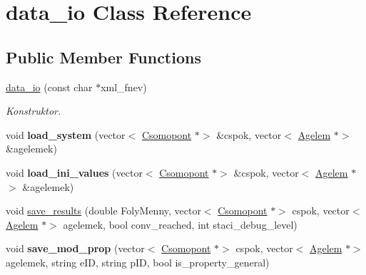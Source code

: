 \hypertarget{classdata__io}{}\section{data\+\_\+io Class Reference}
\label{classdata__io}
\subsection*{Public Member Functions}
\begin{DoxyCompactItemize}
\item 
\mbox{\label{classdata__io_ab2af4a1c42da224e002c9221f7117129}} 
\hyperlink{classdata__io_ab2af4a1c42da224e002c9221f7117129}{data\+\_\+io} (const char $\ast$xml\+\_\+fnev)
\begin{DoxyCompactList}\small\item\em Konstruktor. \end{DoxyCompactList}\item 
\mbox{\label{classdata__io_a6b94381a36f297a3c3014fd593035581}} 
void {\bfseries load\+\_\+system} (vector$<$ \hyperlink{class_csomopont}{Csomopont} $\ast$$>$ \&cspok, vector$<$ \hyperlink{class_agelem}{Agelem} $\ast$$>$ \&agelemek)
\item 
\mbox{\label{classdata__io_a3941963428eab44f1c3c05f3647c9193}} 
void {\bfseries load\+\_\+ini\+\_\+values} (vector$<$ \hyperlink{class_csomopont}{Csomopont} $\ast$$>$ \&cspok, vector$<$ \hyperlink{class_agelem}{Agelem} $\ast$$>$ \&agelemek)
\item 
void \hyperlink{classdata__io_aa0fa92e0eea74827c4c085364fc39185}{save\+\_\+results} (double Foly\+Menny, vector$<$ \hyperlink{class_csomopont}{Csomopont} $\ast$$>$ cspok, vector$<$ \hyperlink{class_agelem}{Agelem} $\ast$$>$ agelemek, bool conv\+\_\+reached, int staci\+\_\+debug\+\_\+level)
\item 
\mbox{\label{classdata__io_aaec948d78d5b7ae7a59503ec2814ad90}} 
void {\bfseries save\+\_\+mod\+\_\+prop} (vector$<$ \hyperlink{class_csomopont}{Csomopont} $\ast$$>$ cspok, vector$<$ \hyperlink{class_agelem}{Agelem} $\ast$$>$ agelemek, string e\+ID, string p\+ID, bool is\+\_\+property\+\_\+general)
\item 
\mbox{\label{classdata__io_a899e9242802f92b269d45e2c4f33b29d}} 

\end{DoxyCompactItemize}
